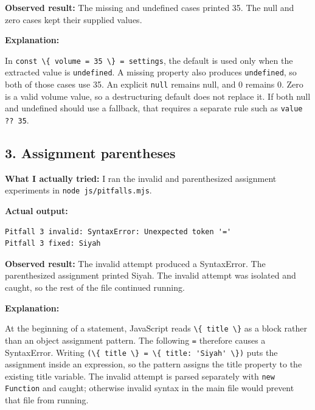 \documentclass[
  10pt,
  a4paper,
  titlepage]{article}
\newcommand{\passthrough}[1]{#1}
\begin{document}
\textbf{Observed result:} The missing and undefined cases printed 35.
The null and zero cases kept their supplied values.


\textbf{Explanation:}

In \passthrough{\lstinline!const \{ volume = 35 \} = settings!}, the
default is used only when the extracted value is
\passthrough{\lstinline!undefined!}. A missing property also produces
\passthrough{\lstinline!undefined!}, so both of those cases use 35. An
explicit \passthrough{\lstinline!null!} remains null, and 0 remains 0.
Zero is a valid volume value, so a destructuring default does not
replace it. If both null and undefined should use a fallback, that
requires a separate rule such as \passthrough{\lstinline!value ?? 35!}.

\subsection{3. Assignment parentheses}\label{assignment-parentheses}

\textbf{What I actually tried:} I ran the invalid and parenthesized
assignment experiments in
\passthrough{\lstinline!node js/pitfalls.mjs!}.

\textbf{Actual output:}

\Needspace{41.2pt}
\begin{lstlisting}
Pitfall 3 invalid: SyntaxError: Unexpected token '='
Pitfall 3 fixed: Siyah
\end{lstlisting}

\textbf{Observed result:} The invalid attempt produced a SyntaxError.
The parenthesized assignment printed Siyah. The invalid attempt was
isolated and caught, so the rest of the file continued running.


\textbf{Explanation:}

At the beginning of a statement, JavaScript reads
\passthrough{\lstinline!\{ title \}!} as a block rather than an object
assignment pattern. The following \passthrough{\lstinline!=!} therefore
causes a SyntaxError. Writing
\passthrough{\lstinline!(\{ title \} = \{ title: 'Siyah' \})!} puts the
assignment inside an expression, so the pattern assigns the title
property to the existing title variable. The invalid attempt is parsed
separately with \passthrough{\lstinline!new Function!} and caught;
otherwise invalid syntax in the main file would prevent that file from
running.
\end{document}
